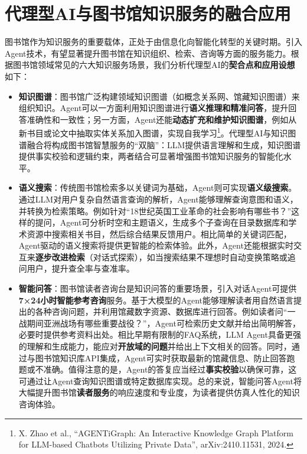\documentclass[
  letterpaper,
]{scrbook}
\begin{document}
\section{代理型AI与图书馆知识服务的融合应用}\label{ux4ee3ux7406ux578baiux4e0eux56feux4e66ux9986ux77e5ux8bc6ux670dux52a1ux7684ux878dux5408ux5e94ux7528}

图书馆作为知识服务的重要载体，正处于由信息化向智能化转型的关键时期。引入Agent技术，有望显著提升图书馆在知识组织、检索、咨询等方面的服务能力。根据图书馆领域常见的六大知识服务场景，我们分析代理型AI的\textbf{契合点和应用设想}如下：

\begin{itemize}
\item
  \textbf{知识图谱}：图书馆广泛构建领域知识图谱（如概念关系网、馆藏知识图谱）来组织知识。Agent可以一方面利用知识图谱进行\textbf{语义推理和精准问答}，提升回答准确性和一致性；另一方面，Agent还能\textbf{动态扩充和维护知识图谱}，例如从新书目或论文中抽取实体关系加入图谱，实现自我学习\footnote{X.
    Zhao et al., ``AGENTiGraph: An Interactive Knowledge Graph Platform
    for LLM-based Chatbots Utilizing Private Data'', arXiv:2410.11531,
    2024.}。代理型AI与知识图谱融合将构成图书馆智慧服务的``双脑''：LLM提供语言理解和生成，知识图谱提供事实校验和逻辑约束，两者结合可显著增强图书馆知识服务的智能化水平。
\item
  \textbf{语义搜索}：传统图书馆检索多以关键词为基础，Agent则可实现\textbf{语义级搜索}。通过LLM对用户复杂自然语言查询的解析，Agent能够理解查询意图和语义，并转换为检索策略。例如针对``18世纪英国工业革命的社会影响有哪些书？''这样的提问，Agent可分析时空和主题语义，生成多个子查询在目录数据库和学术资源中搜索相关书目，然后综合结果反馈用户。相比简单的关键词匹配，Agent驱动的语义搜索将提供更智能的检索体验。此外，Agent还能根据实时交互来\textbf{逐步改进检索}（对话式探索），如当搜索结果不理想时自动变换策略或追问用户，提升查全率与查准率。
\item
  \textbf{智能问答}：图书馆读者咨询台是知识问答的重要场景，引入对话Agent可提供\textbf{7×24小时智能参考咨询}服务。基于大模型的Agent能够理解读者用自然语言提出的各种咨询问题，并利用馆藏数字资源、数据库进行回答。例如读者问``一战期间亚洲战场有哪些重要战役？''，Agent可检索历史文献并给出简明解答，必要时提供参考资料出处。相比早期有限制的FAQ系统，LLM
  Agent具备更强的理解和生成能力，能应对\textbf{开放域的问题}并给出上下文相关的回答。同时，通过与图书馆知识库API集成，Agent可实时获取最新的馆藏信息、防止回答跑题或不准确。值得注意的是，Agent的答复应当经过\textbf{事实校验}以确保可靠，这可通过让Agent查询知识图谱或特定数据库实现。总的来说，智能问答Agent将大幅提升图书馆\textbf{读者服务}的响应速度和专业度，为读者提供仿真人性化的知识咨询体验。

\end{itemize}
\end{document}
